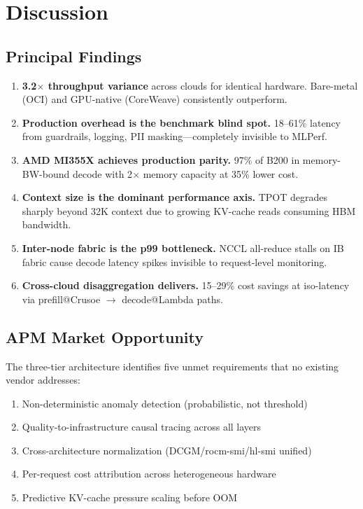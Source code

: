 \documentclass[conference,10pt]{IEEEtran}
\begin{document}
\section{Discussion}
\label{sec:disc}

\subsection{Principal Findings}

\begin{enumerate}
\item \textbf{3.2$\times$ throughput variance} across clouds for identical hardware. Bare-metal (OCI) and GPU-native (CoreWeave) consistently outperform.

\item \textbf{Production overhead is the benchmark blind spot.} 18--61\% latency from guardrails, logging, PII masking---completely invisible to MLPerf.

\item \textbf{AMD MI355X achieves production parity.} 97\% of B200 in memory-BW-bound decode with 2$\times$ memory capacity at 35\% lower cost.

\item \textbf{Context size is the dominant performance axis.} TPOT degrades sharply beyond 32K context due to growing KV-cache reads consuming HBM bandwidth.

\item \textbf{Inter-node fabric is the p99 bottleneck.} NCCL all-reduce stalls on IB fabric cause decode latency spikes invisible to request-level monitoring.

\item \textbf{Cross-cloud disaggregation delivers.} 15--29\% cost savings at iso-latency via prefill@Crusoe $\to$ decode@Lambda paths.
\end{enumerate}

\subsection{APM Market Opportunity}

The three-tier architecture identifies five unmet requirements that no existing vendor addresses:
\begin{enumerate}
\item Non-deterministic anomaly detection (probabilistic, not threshold)
\item Quality-to-infrastructure causal tracing across all layers
\item Cross-architecture normalization (DCGM/rocm-smi/hl-smi unified)
\item Per-request cost attribution across heterogeneous hardware
\item Predictive KV-cache pressure scaling before OOM
\end{enumerate}
\end{document}
